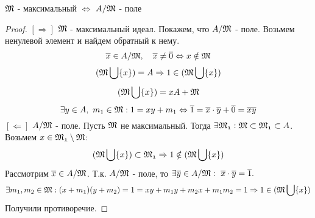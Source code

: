 \begin{thm}
$\mathfrak{M}$ - максимальный $\Leftrightarrow$ $A/\mathfrak{M}$ - поле
\end{thm}
\begin{proof}
$[\Rightarrow]$ $\mathfrak{M}$ - максимальный идеал. Покажем, что $A/\mathfrak{M}$ - поле. Возьмем ненулевой элемент и найдем обратный
к нему.
\[\overline{x} \in A/\mathfrak{M},~~~\overline{x} \neq \overline{0} \Leftrightarrow x \notin \mathfrak{M}\]
\[(\mathfrak{M}\bigcup\{x\}) = A \Rightarrow 1 \in (\mathfrak{M}\bigcup\{x\})\]
\[(\mathfrak{M}\bigcup\{x\}) = xA + \mathfrak{M}\]
\[\exists y \in A, ~ m_1 \in \mathfrak{M}: 1 = xy + m_1 \Leftrightarrow \overline{1} = \overline{x}\cdot\overline{y} + \overline{0}
 = \overline{xy}
\]
$[\Leftarrow]$ $A/\mathfrak{M}$ - поле. Пусть $\mathfrak{M}$ не максимальный. Тогда $\exists \mathfrak{M_1}: \mathfrak{M} \subset \mathfrak{M_1}
\subset A$. Возьмем $x \in \mathfrak{M_1}\setminus\mathfrak{M}$:
\[(\mathfrak{M}\bigcup\{x\}) \subset \mathfrak{M_1} \Rightarrow 1 \notin (\mathfrak{M}\bigcup\{x\})\]
Рассмотрим $\overline{x} \in A/\mathfrak{M}$. Т.к. $A/\mathfrak{M}$ - поле, то $\exists \overline{y} \in A/\mathfrak{M}:~
\overline{x}\cdot\overline{y} = \overline{1}.$
\[\exists m_1, m_2 \in \mathfrak{M}: (x + m_1)(y + m_2) = 1 = xy + m_1y + m_2x + m_1m_2 = 1 \Rightarrow 1 \in
(\mathfrak{M}\bigcup\{x\})\]
Получили противоречие.
\end{proof}

